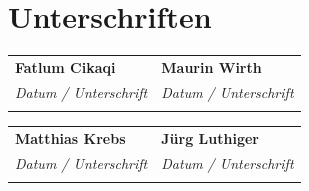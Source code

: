\documentclass[a4paper,12pt]{article}
\begin{document}
\newpage

\section*{Unterschriften\footnotemark}
\vspace{1cm}

\noindent
\begin{tabularx}{\textwidth}{X X}
\textbf{Fatlum Cikaqi} & \textbf{Maurin Wirth} \\[.3cm]
\textit{Datum / Unterschrift} & \textit{Datum / Unterschrift} \\
\noalign{\vspace{1.5cm}} %
\hrulefill & \hrulefill \\
\end{tabularx}

\vspace{2cm}

\noindent
\begin{tabularx}{\textwidth}{X X}
\textbf{Matthias Krebs} & \textbf{Jürg Luthiger} \\[.3cm]
\textit{Datum / Unterschrift} & \textit{Datum / Unterschrift} \\
\noalign{\vspace{1.5cm}} %
\hrulefill & \hrulefill \\
\end{tabularx}

\end{document}
